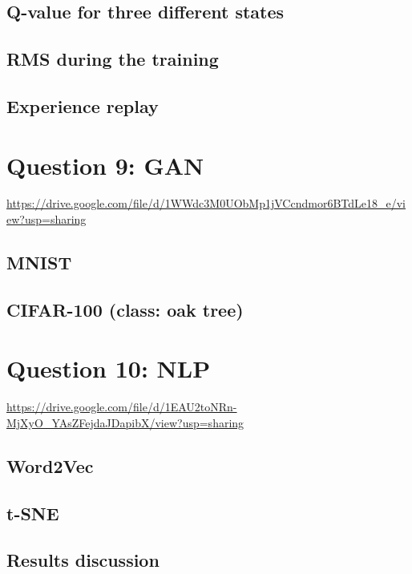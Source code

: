 \documentclass[a4paper]{article}    %
\begin{document}
\subsection{Q-value for three different states}

\subsection{RMS during the training}

\subsection{Experience replay}

\section{Question 9: GAN}

\href{https://drive.google.com/file/d/1WWdc3M0UObMp1jVCcndmor6BTdLe18\_e/view?usp=sharing}{https://drive.google.com/file/d/1WWdc3M0UObMp1jVCcndmor6BTdLe18\_e/view?usp=sharing}

\subsection{MNIST}

\subsection{CIFAR-100 (class: oak tree)}

\section{Question 10: NLP}

\href{https://drive.google.com/file/d/1EAU2toNRn-MjXyO_YAsZFejdaJDapibX/view?usp=sharing}{https://drive.google.com/file/d/1EAU2toNRn-MjXyO\_YAsZFejdaJDapibX/view?usp=sharing}

\subsection{Word2Vec}

\subsection{t-SNE}

\subsection{Results discussion}

\end{document}
